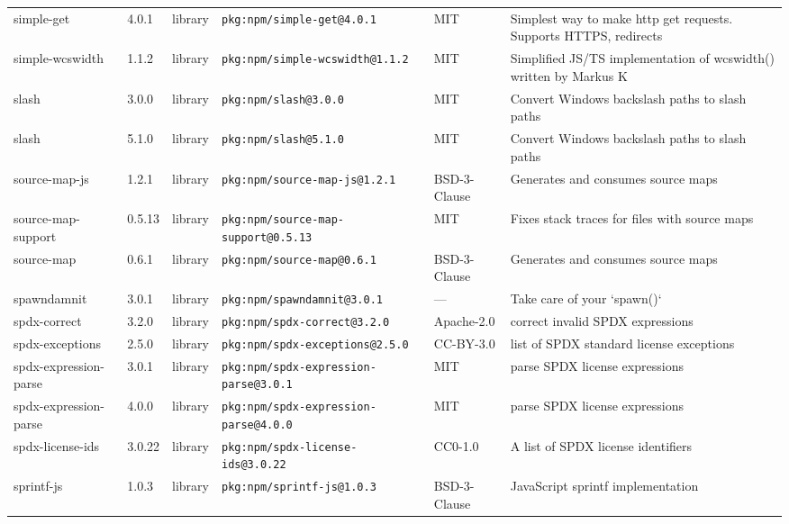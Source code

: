 \documentclass[11pt,a4paper]{article}
\begin{document}
\begin{longtable}{|p{4cm}|p{2cm}|p{1.6cm}|p{5cm}|p{1.5cm}|p{3.5cm}|}
\raggedright simple-get & 4.0.1 & library & \small\texttt{pkg:npm/simple-get@4.0.1} & MIT & \small Simplest way to make http get requests. Supports HTTPS, redirects \\
\raggedright simple-wcswidth & 1.1.2 & library & \small\texttt{pkg:npm/simple-wcswidth@1.1.2} & MIT & \small Simplified JS/TS implementation of wcswidth() written by Markus K \\
\raggedright slash & 3.0.0 & library & \small\texttt{pkg:npm/slash@3.0.0} & MIT & \small Convert Windows backslash paths to slash paths \\
\raggedright slash & 5.1.0 & library & \small\texttt{pkg:npm/slash@5.1.0} & MIT & \small Convert Windows backslash paths to slash paths \\
\raggedright source-map-js & 1.2.1 & library & \small\texttt{pkg:npm/source-map-js@1.2.1} & BSD-3-Clause & \small Generates and consumes source maps \\
\raggedright source-map-support & 0.5.13 & library & \small\texttt{pkg:npm/source-map-support@0.5.13} & MIT & \small Fixes stack traces for files with source maps \\
\raggedright source-map & 0.6.1 & library & \small\texttt{pkg:npm/source-map@0.6.1} & BSD-3-Clause & \small Generates and consumes source maps \\
\raggedright spawndamnit & 3.0.1 & library & \small\texttt{pkg:npm/spawndamnit@3.0.1} & — & \small Take care of your `spawn()` \\
\raggedright spdx-correct & 3.2.0 & library & \small\texttt{pkg:npm/spdx-correct@3.2.0} & Apache-2.0 & \small correct invalid SPDX expressions \\
\raggedright spdx-exceptions & 2.5.0 & library & \small\texttt{pkg:npm/spdx-exceptions@2.5.0} & CC-BY-3.0 & \small list of SPDX standard license exceptions \\
\raggedright spdx-expression-parse & 3.0.1 & library & \small\texttt{pkg:npm/spdx-expression-parse@3.0.1} & MIT & \small parse SPDX license expressions \\
\raggedright spdx-expression-parse & 4.0.0 & library & \small\texttt{pkg:npm/spdx-expression-parse@4.0.0} & MIT & \small parse SPDX license expressions \\
\raggedright spdx-license-ids & 3.0.22 & library & \small\texttt{pkg:npm/spdx-license-ids@3.0.22} & CC0-1.0 & \small A list of SPDX license identifiers \\
\raggedright sprintf-js & 1.0.3 & library & \small\texttt{pkg:npm/sprintf-js@1.0.3} & BSD-3-Clause & \small JavaScript sprintf implementation \\

\end{longtable}
\end{document}
